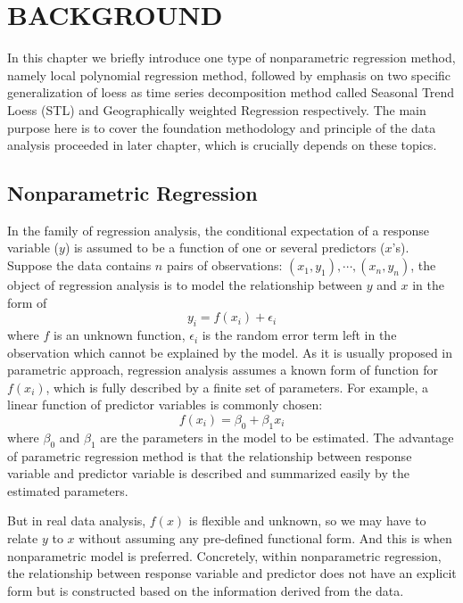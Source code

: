 \chapter{BACKGROUND}

In this chapter we briefly introduce one type of nonparametric regression method,
namely local polynomial regression method, followed by emphasis on two specific 
generalization of loess as time series decomposition method called Seasonal 
Trend Loess (STL) and Geographically weighted Regression respectively. The main
purpose here is to cover the foundation methodology and principle of the data
analysis proceeded in later chapter, which is crucially depends on these topics.  


\section{Nonparametric Regression}

In the family of regression analysis, the conditional expectation of a response 
variable ($y$) is assumed to be a function of one or several predictors ($x$'s). 
Suppose the data contains $n$ pairs of observations: 
$(x_1, y_1), \cdots, (x_n, y_n)$, the object of regression analysis is to model 
the relationship between $y$ and $x$ in the form of
\begin{equation} 
y_i = f(x_i) + \epsilon_i
\end{equation} 
where $f$ is an unknown function, $\epsilon_i$ is the random error term left in 
the observation which cannot be explained by the model. 
As it is usually proposed in parametric approach, regression analysis assumes a 
known form of function for $f(x_i)$, which is fully described by a finite 
set of parameters. For example, a linear function of predictor variables is 
commonly chosen:
\begin{equation} 
f(x_i) = \beta_0 + \beta_1x_i
\end{equation} 
where $\beta_0$ and $\beta_1$ are the parameters in the model to be estimated. 
The advantage of parametric regression method is that the relationship 
between response variable and predictor variable is described and summarized 
easily by the estimated parameters.

But in real data analysis, $f(x)$ is flexible and unknown, so we may have to 
relate $y$ to $x$ without assuming any pre-defined functional form. And this is 
when nonparametric model is preferred. Concretely, within nonparametric 
regression, the relationship between response variable and predictor does not 
have an explicit form but is constructed based on the information derived from
the data.

